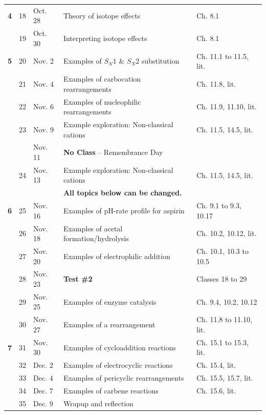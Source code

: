 \begin{longtable}{cp{0.8cm}p{1.8cm}p{7cm}p{3cm}}
 
\textbf{4}&18    &Oct. 28  & Theory of isotope effects                                 &Ch. 8.1                \\
      &19    &Oct. 30  & Interpreting isotope effects                              &Ch. 8.1                \\
\textbf{5}&20    &Nov. 2  & Examples of $S_N1$ \& $S_N2$ substitution  &Ch. 11.1 to 11.5, lit.   \\
      &21    &Nov. 4  & Examples of carbocation rearrangements                     &Ch. 11.8, lit.           \\
      &22    &Nov. 6  & Examples of nucleophilic rearrangements                    &Ch. 11.9, 11.10, lit.    \\
      &23    &Nov. 9   & Example exploration: Non-classical cations                &Ch. 11.5, 14.5, lit.     \\
      &      &Nov. 11   & \textbf{No Class} -- Remembrance Day                             &     \\
      &24    &Nov. 13   & Example exploration: Non-classical cations               &Ch. 11.5, 14.5, lit.  \\
      &      &         & \textbf{All topics below can be changed.}   &              \\
\textbf{6}&25    &Nov. 16  & Examples of pH-rate profile for aspirin                   &Ch. 9.1 to 9.3, 10.17 \\
      &26    &Nov. 18  & Examples of acetal formation/hydrolysis                   &Ch. 10.2, 10.12, lit.     \\
      &27    &Nov. 20  & Examples of electrophilic addition  &Ch. 10.1, 10.3 to 10.5\\
      &28    &Nov. 23  &\textbf{Test \#2}                                              &Classes 18 to 29        \\
      &29    &Nov. 25  & Examples of enzyme catalysis                              &Ch. 9.4, 10.2, 10.12   \\   
      &30    &Nov. 27  & Examples of a rearrangement                               &Ch. 11.8 to 11.10, lit. \\
\textbf{7}&31    &Nov. 30  & Examples of cycloaddition reactions                       &Ch. 15.1 to 15.3, lit.   \\
      &32    &Dec. 2   & Examples of electrocyclic reactions                       &Ch. 15.4, lit.           \\
      &33    &Dec. 4   & Examples of pericyclic rearrangements                     &Ch. 15.5, 15.7, lit.     \\
      &34    &Dec. 7  & Examples of carbene reactions                              &Ch. 15.6, lit.           \\
      &35    &Dec. 9  & Wrapup and reflection                                      &           \\





\bottomrule
\end{longtable}


